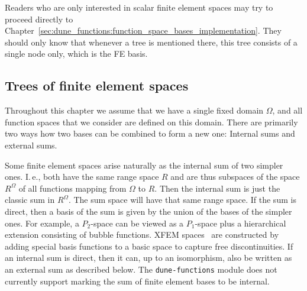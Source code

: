 \documentclass[a4paper,10pt,headings=normal,bibliography=totoc]{scrartcl}
\newcommand{\dunemodule}[1]{\texttt{#1}}
\begin{document}
Readers who are only interested in scalar finite element spaces may try to proceed directly to
Chapter~\ref{sec:dune_functions:function_space_bases_implementation}.  They should only know that whenever a tree
is mentioned there, this tree consists of a single node only, which is the FE basis.

\subsection{Trees of finite element spaces}

Throughout this chapter we assume that we have a single fixed domain $\Omega$, and all function spaces
that we consider are defined on this domain.
There are primarily two ways how two bases can be combined to form a new one:
Internal sums and external sums.

Some finite element spaces arise naturally as the internal sum of two simpler ones.
I.\,e., both have the same range space $R$ and are thus subspaces of the space $R^\Omega$
of all functions mapping from $\Omega$ to $R$. Then the internal sum is just the classic
sum in $R^\Omega$.  The sum space will have that same range space.
If the sum is direct, then a basis of the sum is given by the union of the bases of
the simpler ones.
For example,
a $P_2$-space can be viewed as a $P_1$-space plus a hierarchical extension consisting of bubble functions.
XFEM spaces~\cite{moes_dolbow_belytschko:1999} are constructed by adding special basis functions to a basic space to capture
free discontinuities.
If an internal sum is direct, then it can, up to an isomorphism, also be written as
an external sum as described below.
The \dunemodule{dune-functions} module does not currently support marking the sum
of finite element bases to be internal.
\end{document}
